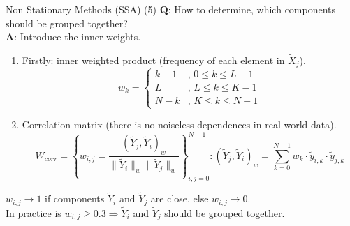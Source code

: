 \documentclass[aspectratio= 169]{beamer}
\begin{document}
			\begin{frame}{Non Stationary Methods (SSA) (5)}
				\textbf{Q}: How to determine, which components should be grouped together?\\
				\textbf{A}: Introduce the inner weights.
				\begin{enumerate}
					\item Firstly: inner weighted product (frequency of each element in $\tilde{X}_j$).
					\begin{equation}
						w_k = \left\{\begin{array}{ll}
							k + 1 & \text{, } 0 \le k \le L - 1\\
							L & \text{, } L \le k \le K - 1\\
							N - k & \text{, } K \le k \le N - 1
						\end{array}\right.
					\end{equation}
				
					\item Correlation matrix (there is no noiseless dependences in real world data).
					\begin{equation}
						W_{corr} = \left\{ w_{i, j} = \frac{\left(\tilde{Y}_j, \tilde{Y}_i\right)_w}{\lVert \tilde{Y}_i \rVert_w \lVert \tilde{Y}_j \rVert_w} \right\}_{i, j = 0}^{N - 1}: \left(\tilde{Y}_j, \tilde{Y}_i\right)_w = \sum_{k = 0}^{N - 1} w_k \cdot \tilde{y}_{i, k} \cdot \tilde{y}_{j, k}
					\end{equation}
				\end{enumerate}
				$w_{i, j} \rightarrow 1$ if components $\tilde{Y}_i$ and $\tilde{Y}_j$ are close, else $w_{i, j} \rightarrow 0$.\\ In practice is $w_{i, j} \ge 0.3 \Rightarrow \tilde{Y}_i$ and $\tilde{Y}_j$ should be grouped together.
			\end{frame}
		
\end{document}
